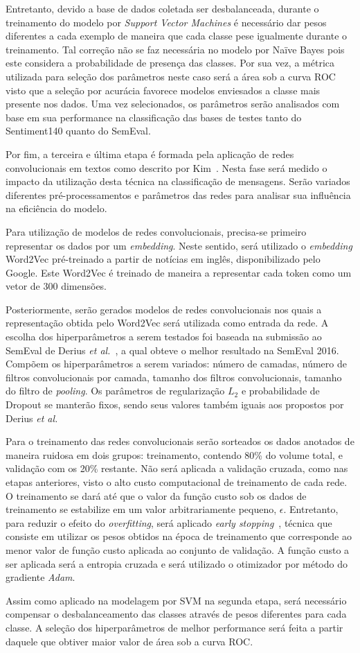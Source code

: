 Entretanto, devido a base de dados coletada ser desbalanceada, durante o treinamento do modelo por
\textit{Support Vector Machines} é necessário dar pesos diferentes a cada exemplo de maneira que cada classe pese
igualmente durante o treinamento.
Tal correção não se faz necessária no modelo por Naïve Bayes pois este considera a probabilidade de presença das classes.
Por sua vez, a métrica utilizada para seleção dos parâmetros neste caso será a área sob a curva ROC visto que a seleção por
acurácia favorece modelos enviesados a classe mais presente nos dados.
Uma vez selecionados, os parâmetros serão analisados com base em sua performance na classificação das bases de testes tanto
do Sentiment140 quanto do SemEval.

Por fim, a terceira e última etapa é formada pela aplicação de redes convolucionais em textos como descrito por
Kim~\cite{kim14}.
Nesta fase será medido o impacto da utilização desta técnica na classificação de mensagens.
Serão variados diferentes pré-processamentos e parâmetros das redes para analisar sua influência na eficiência do
modelo.

Para utilização de modelos de redes convolucionais, precisa-se primeiro representar os dados por um \textit{embedding}.
Neste sentido, será utilizado o \textit{embedding} Word2Vec pré-treinado a partir de notícias em inglês, disponibilizado
pelo Google.
Este Word2Vec é treinado de maneira a representar cada token como um vetor de 300 dimensões.

Posteriormente, serão gerados modelos de redes convolucionais nos quais a representação obtida pelo Word2Vec será utilizada
como entrada da rede.
A escolha dos hiperparâmetros a serem testados foi baseada na submissão ao SemEval de Derius
\textit{et al.}~\cite{deriu16}, a qual obteve o melhor resultado na SemEval 2016.
Compõem os hiperparâmetros a serem variados: número de camadas, número de filtros convolucionais por camada, tamanho dos filtros
convolucionais, tamanho do filtro de \textit{pooling}.
Os parâmetros de regularização $L_{2}$ e probabilidade de Dropout se manterão fixos, sendo seus valores também iguais aos
propostos por Derius \textit{et al.}

Para o treinamento das redes convolucionais serão sorteados os dados anotados de maneira ruidosa em dois grupos:
treinamento, contendo 80\% do volume total, e validação com os 20\% restante.
Não será aplicada a validação cruzada, como nas etapas anteriores, visto o alto custo computacional de treinamento de cada
rede.
O treinamento se dará até que o valor da função custo sob os dados de treinamento se estabilize em um valor
arbitrariamente pequeno, $\epsilon$.
Entretanto, para reduzir o efeito do \textit{overfitting}, será aplicado \textit{early stopping}~\cite{caruana01},
técnica que consiste em utilizar os pesos obtidos na época de treinamento que corresponde ao menor valor de função custo
aplicada ao conjunto de validação.
A função custo a ser aplicada será a entropia cruzada e será utilizado o otimizador por método do gradiente \textit{Adam}.

Assim como aplicado na modelagem por SVM na segunda etapa, será necessário compensar o desbalanceamento das classes
através de pesos diferentes para cada classe.
A seleção dos hiperparâmetros de melhor performance será feita a partir daquele que obtiver maior valor de área sob a curva
ROC.
